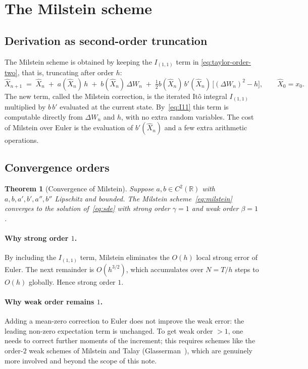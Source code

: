 \documentclass[11pt,a4paper]{article}
\theoremstyle{plain}
\newtheorem{theorem}{Theorem}[section]
\theoremstyle{definition}
\theoremstyle{remark}
\newcommand{\R}{\mathbb{R}}
\begin{document}
\section{The Milstein scheme}
\label{sec:milstein}

\subsection{Derivation as second-order truncation}

The Milstein scheme is obtained by keeping the $I_{(1,1)}$ term in
\eqref{eq:taylor-order-two}, that is, truncating after order $h$:
\begin{equation}
\label{eq:milstein}
\hat X_{n+1} \;=\; \hat X_n
\;+\; a(\hat X_n)\, h
\;+\; b(\hat X_n)\, \Delta W_n
\;+\; \tfrac{1}{2} b(\hat X_n)\, b'(\hat X_n)\,
\big[(\Delta W_n)^2 - h\big],
\qquad \hat X_0 = x_0.
\end{equation}
The new term, called the Milstein correction, is the iterated It\^o
integral $I_{(1,1)}$ multiplied by $b\, b'$ evaluated at the current
state. By~\eqref{eq:I11} this term is computable directly from
$\Delta W_n$ and $h$, with no extra random variables. The cost of
Milstein over Euler is the evaluation of $b'(\hat X_n)$ and a few
extra arithmetic operations.

\subsection{Convergence orders}

\begin{theorem}[Convergence of Milstein]
\label{thm:milstein-conv}
Suppose $a, b \in C^2(\R)$ with $a, b, a', b', a'', b''$ Lipschitz
and bounded. The Milstein scheme~\eqref{eq:milstein} converges to the
solution of~\eqref{eq:sde} with strong order $\gamma = 1$ and weak
order $\beta = 1$.
\end{theorem}

\paragraph{Why strong order $1$.} By including the
$I_{(1,1)}$ term, Milstein eliminates the $O(h)$ local strong error
of Euler. The next remainder is $O(h^{3/2})$, which accumulates over
$N = T/h$ steps to $O(h)$ globally. Hence strong order $1$.

\paragraph{Why weak order remains $1$.} Adding a mean-zero correction
to Euler does not improve the weak error: the leading non-zero
expectation term is unchanged. To get weak order $> 1$, one needs to
correct further moments of the increment; this requires schemes like
the order-$2$ weak schemes of Milstein and Talay
(Glasserman~\cite[Section~6.2]{Glasserman}), which are genuinely more
involved and beyond the scope of this note.
\end{document}

